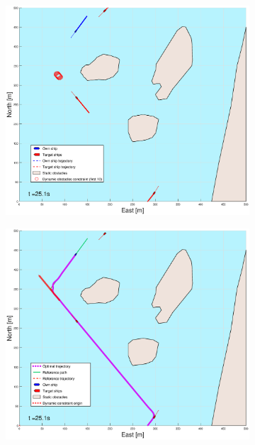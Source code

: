 \begin{figure}[!ht] %
    \begin{subfigure}[b]{0.494\textwidth}
        \centering
        \includegraphics[width=\textwidth]{Images/Figures/Helloya_Rev/_Simple_1fig1_time=25}
        \subcaption{}
    \end{subfigure}
    \hfill
    \begin{subfigure}[b]{0.494\textwidth}
        \centering
        \includegraphics[width=\textwidth]{Images/Figures/Helloya_Rev/_Simple_1fig999_time=25}

\end{subfigure}
\end{figure}
